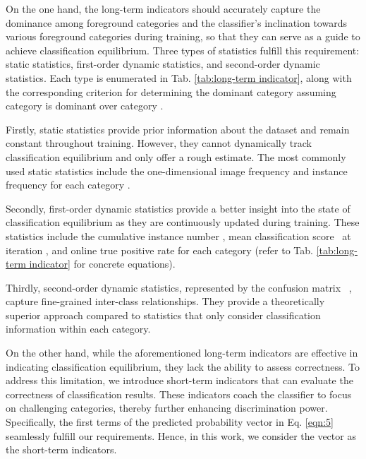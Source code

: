 \documentclass[lettersize,journal]{IEEEtran}
\begin{document}
On the one hand, the long-term indicators should accurately capture the dominance among foreground categories and the classifier's inclination towards various foreground categories during training, so that they can serve as a guide to achieve classification equilibrium.
Three types of statistics fulfill this requirement: static statistics, first-order dynamic statistics, and second-order dynamic statistics.
Each type is enumerated in Tab. \ref{tab:long-term indicator}, along with the corresponding criterion for determining the dominant category assuming category  is dominant over category .

Firstly, static statistics provide prior information about the dataset and remain constant throughout training.
However, they cannot dynamically track classification equilibrium and only offer a rough estimate.
The most commonly used static statistics include the one-dimensional image frequency  and instance frequency  for each category .

Secondly, first-order dynamic statistics provide a better insight into the state of classification equilibrium as they are continuously updated during training.
These statistics include the cumulative instance number , mean classification score~\cite{feng2021exploring}  at iteration , and online true positive rate  for each category 
(refer to Tab. \ref{tab:long-term indicator} for concrete equations).

Thirdly, second-order dynamic statistics, represented by the confusion matrix~\cite{he2022relieving} , capture fine-grained inter-class relationships.
They provide a theoretically superior approach compared to statistics that only consider classification information within each category.























On the other hand, while the aforementioned long-term indicators are effective in indicating classification equilibrium, they lack the ability to assess correctness.
To address this limitation, we introduce short-term indicators that can evaluate the correctness of classification results.
These indicators coach the classifier to focus on challenging categories, thereby further enhancing discrimination power.
Specifically, the first  terms of the predicted probability vector  in Eq. \eqref{eqn:5} seamlessly fulfill our requirements.
Hence, in this work, we consider the vector  as the short-term indicators.
\end{document}
